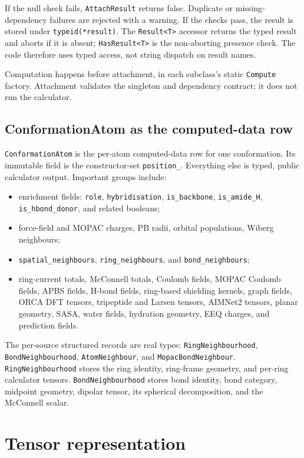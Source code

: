 \documentclass[11pt]{article}
\newcommand{\code}[1]{\texttt{#1}}
\begin{document}
If the null check fails, \code{AttachResult} returns false. Duplicate or
missing-dependency failures are rejected with a warning. If the checks pass,
the result is stored under \code{typeid(*result)}. The
\code{Result<T>} accessor returns the typed result and aborts if it is absent;
\code{HasResult<T>} is the non-aborting presence check. The code therefore
uses typed access, not string dispatch on result names.

Computation happens before attachment, in each subclass's static
\code{Compute} factory. Attachment validates the singleton and dependency
contract; it does not run the calculator.

\subsection{ConformationAtom as the computed-data row}

\code{ConformationAtom} is the per-atom computed-data row for one
conformation. Its immutable field is the constructor-set \code{position\_}.
Everything else is typed, public calculator output. Important groups include:

\begin{itemize}
\item enrichment fields: \code{role}, \code{hybridisation},
\code{is\_backbone}, \code{is\_amide\_H}, \code{is\_hbond\_donor}, and
related booleans;
\item force-field and MOPAC charges, PB radii, orbital populations, Wiberg
neighbours;
\item \code{spatial\_neighbours}, \code{ring\_neighbours}, and
\code{bond\_neighbours};
\item ring-current totals, McConnell totals, Coulomb fields, MOPAC Coulomb
fields, APBS fields, H-bond fields, ring-based shielding kernels, graph
fields, ORCA DFT tensors, tripeptide and Larsen tensors, AIMNet2 tensors,
planar geometry, SASA, water fields, hydration geometry, EEQ charges, and
prediction fields.
\end{itemize}

The per-source structured records are real types:
\code{RingNeighbourhood}, \code{BondNeighbourhood}, \code{AtomNeighbour}, and
\code{MopacBondNeighbour}. \code{RingNeighbourhood} stores the ring identity,
ring-frame geometry, and per-ring calculator tensors. \code{BondNeighbourhood}
stores bond identity, bond category, midpoint geometry, dipolar tensor, its
spherical decomposition, and the McConnell scalar.

\section{Tensor representation}
\end{document}
